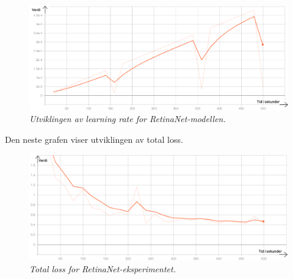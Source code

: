 \begin{figure}[H]
\begin{center} 
\includegraphics[scale=0.35]{figures/lr_retinanet_5}
\caption{\small \sl Utviklingen av learning rate for RetinaNet-modellen. \label{fig:lr_retinanet}}
\end{center}
\end{figure}



Den neste grafen viser utviklingen av total loss.

\begin{figure}[H]
\begin{center} 
\includegraphics[scale=0.35]{figures/total_loss_retinanet_8}
\caption{\small \sl Total loss for RetinaNet-eksperimentet. \label{fig:total_loss_retinanet}}
\end{center}
\end{figure}

